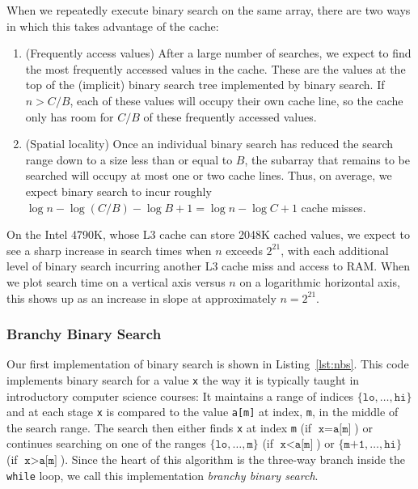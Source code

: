 \documentclass{patmorin}
\newcommand{\lstref}[1]{Listing~\ref{lst:#1}}
\begin{document}
When we repeatedly execute binary search on the same array, there are
two ways in which this takes advantage of the cache:

\begin{enumerate}
  \item (Frequently access values) After a large number of searches,
    we expect to find the most frequently accessed values in the cache.
    These are the values at the top of the (implicit) binary search tree
    implemented by binary search.  If $n>C/B$, each of these values will
    occupy their own cache line, so the cache only has room for $C/B$
    of these frequently accessed values.
  \item (Spatial locality) Once an individual binary search has reduced
    the search range down to a size less than or equal to $B$, the
    subarray that remains to be searched will occupy at most one or two
    cache lines. Thus, on average, we expect binary search to incur
    roughly $\log n -\log(C/B) - \log B + 1 = \log n - \log C + 1$
    cache misses.
\end{enumerate}

On the Intel 4790K, whose L3 cache can store 2048K cached values, we
expect to see a sharp increase in search times when $n$ exceeds $2^{21}$,
with each additional level of binary search incurring another L3 cache
miss and access to RAM.  When we plot search time on a vertical axis
versus $n$ on a logarithmic horizontal axis, this shows up as an increase
in slope at approximately $n=2^{21}$.

\subsubsection{Branchy Binary Search}

Our first implementation of binary search is shown in
\lstref{nbs}. This code implements binary search for a
value \texttt{x} the way it is typically taught in
introductory computer science courses: It maintains a range of indices
$\{\texttt{lo},\ldots,\texttt{hi}\}$ and at each stage
\texttt{x} is compared to the value \texttt{a[m]} at
index, \texttt{m}, in the middle of the search range. The search
then either finds \texttt{x} at index \texttt{m} (if
$\texttt{x}=\texttt{a[m]}$) or continues searching on
one of the ranges $\{\texttt{lo},\ldots,\texttt{m}\}$
(if $\texttt{x}<\texttt{a[m]}$) or
$\{\texttt{m+1},\ldots,\texttt{hi}\}$ (if
$\texttt{x}>\texttt{a[m]}$).  Since the heart of this
algorithm is the three-way branch inside the \texttt{while}
loop, we call this implementation \emph{branchy binary search}.
\end{document}

